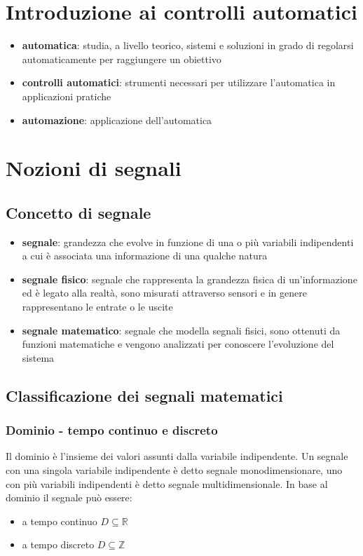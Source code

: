 \section{Introduzione ai controlli automatici}
\begin{itemize}
	\item \textbf{automatica}: studia, a livello teorico, sistemi e soluzioni in grado di regolarsi automaticamente per raggiungere un obiettivo
	\item \textbf{controlli automatici}: strumenti necessari per utilizzare l'automatica in applicazioni pratiche
	\item \textbf{automazione}: applicazione dell'automatica
\end{itemize}

\section{Nozioni di segnali}
\subsection{Concetto di segnale}
\begin{itemize}
	\item \textbf{segnale}: grandezza che evolve in funzione di una o più variabili indipendenti a cui è associata una informazione
	di una qualche natura
	\item \textbf{segnale fisico}: segnale che rappresenta la grandezza fisica di un'informazione ed è legato alla realtà, sono
	misurati attraverso sensori e in genere rappresentano le entrate o le uscite
	\item \textbf{segnale matematico}: segnale che modella segnali fisici, sono ottenuti da funzioni matematiche e vengono analizzati
	per conoscere l'evoluzione del sistema
\end{itemize}

\subsection{Classificazione dei segnali matematici}
\subsubsection*{Dominio - tempo continuo e discreto}
Il dominio è l'insieme dei valori assunti dalla variabile indipendente. Un segnale con una singola variabile indipendente è detto segnale
monodimensionare, uno con più variabili indipendenti è detto segnale multidimensionale. In base al dominio il segnale può essere:
\begin{itemize}
	\item a tempo continuo \(D \subseteq \mathbb{R}\)
	\item a tempo discreto \(D \subseteq \mathbb{Z}\)
\end{itemize}


